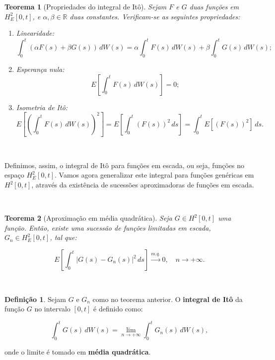 \documentclass[
  11pt,
  a4paper,
]{book}
\newtheorem{theorem}{Teorema}[chapter]
\theoremstyle{definition}
\newtheorem{definition}{Definição}[chapter]
\theoremstyle{definition}
\theoremstyle{definition}
\theoremstyle{definition}
\theoremstyle{remark}
\begin{document}
\begin{theorem}[Propriedades do integral de Itô]

Sejam \(F\) e \(G\) duas funções em \(H_E^2[0,t]\), e \(\alpha, \beta \in \mathbb{R}\) duas constantes. Verificam-se as seguintes propriedades:

\begin{enumerate}
\def\labelenumi{\arabic{enumi}.}
\item
  Linearidade:
  \[
  \int_0^t \left(\alpha F(s) + \beta G(s)\right) \, dW(s)
  = \alpha \int_0^t F(s) \, dW(s) + \beta \int_0^t G(s) \, dW(s);
  \]
\item
  Esperança nula:
  \[
  E\left[\int_0^t F(s) \, dW(s)\right] = 0;
  \]
\item
  Isometria de Itô:
  \[
  E\left[\left(\int_0^t F(s) \, dW(s)\right)^2\right]
  = E\left[\int_0^t \left(F(s)\right)^2 \, ds\right]
  = \int_0^t E\left[\left(F(s)\right)^2\right] \, ds.
  \]
\end{enumerate}

\end{theorem}

\(\,\)

Definimos, assim, o integral de Itô para funções em escada, ou seja, funções no espaço \(H_E^2[0,t]\). Vamos agora generalizar este integral para funções genéricas em \(H^2[0,t]\), através da existência de sucessões aproximadoras de funções em escada.

\(\,\)

\begin{theorem}[Aproximação em média quadrática]
Seja \(G \in H^2[0,t]\) uma função. Então, existe uma sucessão de funções limitadas em escada, \(G_n \in H_E^2[0,t]\), tal que:

\[
E\left[\int_0^t |G(s) - G_n(s)|^2 \, ds\right] \xrightarrow{m.q.} 0, \quad n \rightarrow +\infty.
\]
\end{theorem}

\(\,\)

\begin{definition}
Sejam \(G\) e \(G_n\) como no teorema anterior. O \textbf{integral de Itô} da função \(G\) no intervalo \([0,t]\) é definido como:

\[
\int_0^t G(s) \, dW(s) = \lim_{n \to +\infty} \int_0^t G_n(s) \, dW(s),
\]

onde o limite é tomado em \textbf{média quadrática}.
\end{definition}

\(\,\)
\end{document}
